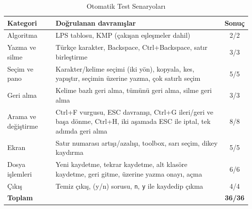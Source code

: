 \documentclass[conference,a4paper]{IEEEtran}
\newcommand{\kod}[1]{\texttt{#1}}
\begin{document}
\begin{table}[t]
\centering
\caption{Otomatik Test Senaryoları}
\label{tab:testler}
\begin{tabular}{@{}p{2.6cm}p{4.2cm}c@{}}
\toprule
\textbf{Kategori} & \textbf{Doğrulanan davranışlar} & \textbf{Sonuç} \\
\midrule
Algoritma & LPS tablosu, KMP (çakışan eşleşmeler dahil) & 2/2 \\
Yazma ve silme & Türkçe karakter, Backspace, Ctrl+Backspace, satır birleştirme & 3/3 \\
Seçim ve pano & Karakter/kelime seçimi (iki yön), kopyala, kes, yapıştır, seçimin üzerine yazma, çok satırlı seçim & 5/5 \\
Geri alma & Kelime bazlı geri alma, tümünü geri alma, silme geri alma & 3/3 \\
Arama ve değiştirme & Ctrl+F vurgusu, ESC davranışı, Ctrl+G ileri/geri ve başa dönme, Ctrl+H, iki aşamada ESC ile iptal, tek adımda geri alma & 8/8 \\
Ekran & Satır numarası artışı/azalışı, toolbox, sarı seçim, dikey kaydırma & 5/5 \\
Dosya işlemleri & Yeni kaydetme, tekrar kaydetme, alt klasöre kaydetme, geri gitme, üzerine yazma onayı, açma & 6/6 \\
Çıkış & Temiz çıkış, (y/n) sorusu, \kod{n}, \kod{y} ile kaydedip çıkma & 4/4 \\
\midrule
\textbf{Toplam} & & \textbf{36/36} \\
\bottomrule
\end{tabular}
\end{table}
\end{document}

